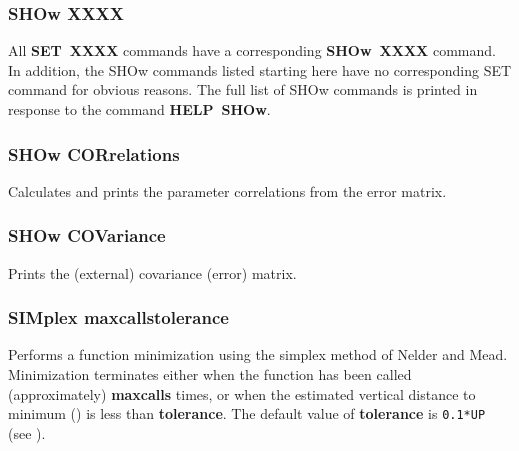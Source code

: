 \subsubsection*{SHOw   XXXX}

All {\bf SET~XXXX} commands have a corresponding
{\bf SHOw~XXXX} command.
In addition, the SHOw commands listed starting here have no corresponding
SET command for obvious reasons.  The full list of SHOw commands
is printed in response to the command {\bf HELP~SHOw}.

\subsubsection*{SHOw CORrelations}

Calculates and prints the parameter correlations from the error matrix.

\subsubsection*{SHOw COVariance}

Prints the (external) covariance (error) matrix.

\subsubsection*{SIMplex  \lsb maxcalls\rsb   \lsb tolerance\rsb }

Performs a function minimization using the simplex method of Nelder and
Mead. Minimization terminates either when the function has been called
(approximately) {\bf \lsb maxcalls\rsb } times,
or when the estimated vertical
distance to minimum () is less than {\bf \lsb tolerance\rsb }.
The default value of {\bf \lsb tolerance\rsb } is
\texttt{0.1*UP} (see ).
